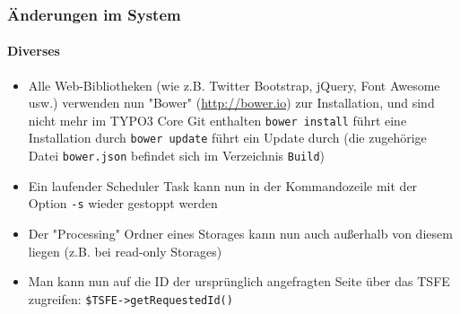 \begin{frame}[fragile]
	\frametitle{Änderungen im System}
	\framesubtitle{Diverses}

	\begin{itemize}

		\item Alle Web-Bibliotheken (wie z.B. Twitter Bootstrap, jQuery, Font Awesome usw.) verwenden
			nun "Bower" (\url{http://bower.io}) zur Installation, und sind nicht mehr im TYPO3 Core Git
			enthalten\newline
			\small
				\texttt{bower install}	\tabto{3cm}führt eine Installation durch\newline
				\texttt{bower update}	\tabto{3cm}führt ein Update durch\newline
			\normalsize
			(die zugehörige Datei \texttt{bower.json} befindet sich im Verzeichnis \texttt{Build})

		\item Ein laufender Scheduler Task kann nun in der Kommandozeile mit der Option \texttt{-s}
			wieder gestoppt werden

		\item Der "Processing" Ordner eines Storages kann nun auch außerhalb von diesem liegen
			(z.B. bei read-only Storages)

		\item Man kann nun auf die ID der ursprünglich angefragten Seite über das TSFE zugreifen:
			\texttt{\$TSFE->getRequestedId()}

	\end{itemize}

\end{frame}


